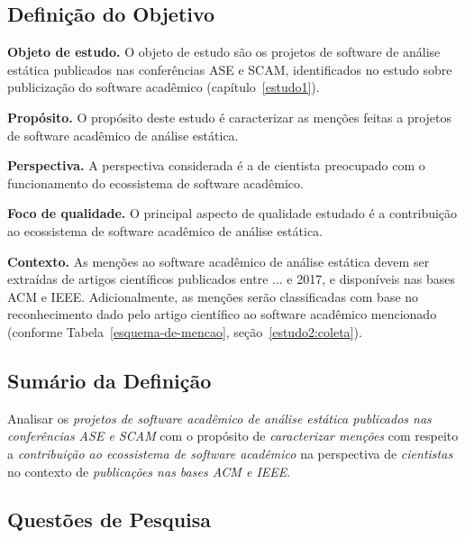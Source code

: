 \subsection{Definição do Objetivo}

\begin{description}
\item{\bf Objeto de estudo.} 
O objeto de estudo são os projetos de software de análise estática publicados nas conferências ASE e SCAM,
identificados no estudo sobre publicização do software acadêmico (capítulo~\ref{estudo1}).

\item{\bf Propósito.} 
O propósito deste estudo é caracterizar as menções feitas a 
projetos de software acadêmico de análise estática.

\item{\bf Perspectiva.} 
A perspectiva considerada é a de cientista preocupado com o funcionamento do ecossistema de software acadêmico.

\item{\bf Foco de qualidade.} 
O principal aspecto de qualidade estudado é 
a contribuição ao ecossistema de software acadêmico de análise estática.

\item{\bf Contexto.} 
As menções ao software acadêmico de análise estática devem ser extraídas de 
artigos científicos publicados entre ... e 2017, e disponíveis nas bases ACM e IEEE.
Adicionalmente, as menções serão classificadas com base no 
reconhecimento dado pelo artigo científico ao software acadêmico mencionado
(conforme Tabela~\ref{esquema-de-mencao},  seção~\ref{estudo2:coleta}).
\end{description}


\subsection{Sumário da Definição}

Analisar os \textit{projetos de software acadêmico de análise estática publicados nas conferências ASE e SCAM}
com o propósito de \textit{caracterizar menções}
com respeito a \textit{contribuição ao ecossistema de software acadêmico}
na perspectiva de \textit{cientistas}
no contexto de \textit{publicações nas bases ACM e IEEE}.

\subsection{Questões de Pesquisa}

